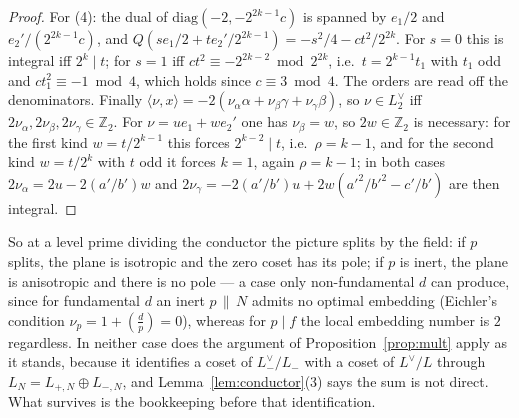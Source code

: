 \documentclass[11pt,reqno]{amsart}
\theoremstyle{plain}
\theoremstyle{definition}
\newcommand{\Z}{\mathbb{Z}}
\newcommand{\Ldual}{L^{\vee}}
\newcommand{\Lm}{L_{-}}
\begin{document}
\begin{proof}
For (4): the dual of $\mathrm{diag}(-2,-2^{2k-1}c)$ is spanned by $e_1/2$ and $e_2'/(2^{2k-1}c)$, and
$Q(se_1/2+te_2'/2^{2k-1})=-s^2/4-ct^2/2^{2k}$. For $s=0$ this is integral iff $2^k\mid t$; for $s=1$
iff $ct^2\equiv-2^{2k-2}\bmod2^{2k}$, i.e.\ $t=2^{k-1}t_1$ with $t_1$ odd and $ct_1^2\equiv-1\bmod4$,
which holds since $c\equiv3\bmod4$. The orders are read off the denominators. Finally
$\langle\nu,x\rangle=-2(\nu_\alpha\alpha+\nu_\beta\gamma+\nu_\gamma\beta)$, so $\nu\in L_2^\vee$ iff
$2\nu_\alpha,2\nu_\beta,2\nu_\gamma\in\Z_2$. For $\nu=ue_1+we_2'$ one has $\nu_\beta=w$, so
$2w\in\Z_2$ is necessary: for the first kind $w=t/2^{k-1}$ this forces $2^{k-2}\mid t$, i.e.\
$\rho=k-1$, and for the second kind $w=t/2^k$ with $t$ odd it forces $k=1$, again $\rho=k-1$; in both
cases $2\nu_\alpha=2u-2(a'/b')w$ and $2\nu_\gamma=-2(a'/b')u+2w(a'^2/b'^2-c'/b')$ are then integral.
\end{proof}

So at a level prime dividing the conductor the picture splits by the field: if $p$ splits, the
plane is isotropic and the zero coset has its pole; if $p$ is inert, the plane is anisotropic and
there is no pole --- a case only non-fundamental $d$ can produce, since for fundamental $d$ an inert
$p\,\|\,N$ admits no optimal embedding (Eichler's condition $\nu_p=1+(\tfrac dp)=0$), whereas for
$p\mid f$ the local embedding number is $2$ regardless. In neither case does the argument of
Proposition~\ref{prop:mult} apply as it stands, because it identifies a coset of $\Lm^\vee/\Lm$ with
a coset of $\Ldual/L$ through $L_N=L_{+,N}\oplus L_{-,N}$, and Lemma~\ref{lem:conductor}(3) says the
sum is not direct. What survives is the bookkeeping before that identification.
\end{document}
